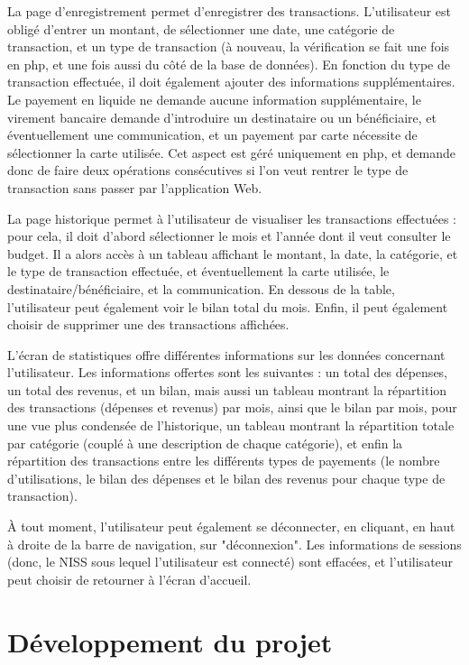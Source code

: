 \documentclass[a4paper,12pt]{article}
\begin{document}
La page d'enregistrement permet d'enregistrer des transactions. L'utilisateur est obligé d'entrer un montant, de sélectionner une date, une catégorie de transaction, et un type de transaction (à nouveau, la vérification se fait une fois en php, et une fois aussi du côté de la base de données). En fonction du type de transaction effectuée, il doit également ajouter des informations supplémentaires. Le payement en liquide ne demande aucune information supplémentaire, le virement bancaire demande d'introduire un destinataire ou un bénéficiaire, et éventuellement une communication, et un payement par carte nécessite de sélectionner la carte utilisée. Cet aspect est géré uniquement en php, et demande donc de faire deux opérations consécutives si l'on veut rentrer le type de transaction sans passer par l'application Web.

La page historique permet à l'utilisateur de visualiser les transactions effectuées : pour cela, il doit d'abord sélectionner le mois et l'année dont il veut consulter le budget. Il a alors accès à un tableau affichant le montant, la date, la catégorie, et le type de transaction effectuée, et éventuellement la carte utilisée, le destinataire/bénéficiaire, et la communication. En dessous de la table, l'utilisateur peut également voir le bilan total du mois. Enfin, il peut également choisir de supprimer une des transactions affichées.

L'écran de statistiques offre différentes informations sur les données concernant l'utilisateur. Les informations offertes sont les suivantes : un total des dépenses, un total des revenus, et un bilan, mais aussi un tableau montrant la répartition des transactions (dépenses et revenus) par mois, ainsi que le bilan par mois, pour une vue plus condensée de l'historique, un tableau montrant la répartition totale par catégorie (couplé à une description de chaque catégorie), et  enfin la répartition des transactions entre les différents types de payements (le nombre d'utilisations, le bilan des dépenses et le bilan des revenus pour chaque type de transaction).

À tout moment, l'utilisateur peut également se déconnecter, en cliquant, en haut à droite de la barre de navigation, sur "déconnexion". Les informations de sessions (donc, le NISS sous lequel l'utilisateur est connecté) sont effacées, et l'utilisateur peut choisir de retourner à l'écran d'accueil.

\newpage

\section{Développement du projet}
\end{document}
